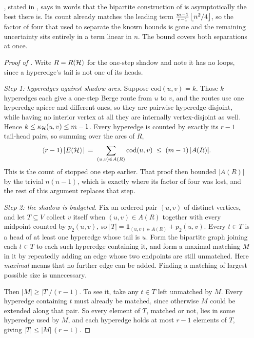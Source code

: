 , stated in , says in words that the bipartite construction of  is asymptotically the best there is. Its count already matches the leading term $\frac{m-1}{r-1}\left\lfloor n^2/4 \right\rfloor$, so the factor of four that used to separate the known bounds is gone and the remaining uncertainty sits entirely in a term linear in $n$. The bound covers both separations at once.

\begin{proof}[Proof of ]
Write $R = R(\mathcal{H})$ for the one-step shadow and note it has no loops, since a
hyperedge's tail is not one of its heads.

\emph{Step 1: hyperedges against shadow arcs.} Suppose $\mathrm{cod}(u,v) = k$.
Those $k$ hyperedges each give a one-step Berge route from $u$ to $v$, and the
routes use one hyperedge apiece and different ones, so they are pairwise
hyperedge-disjoint, while having no interior vertex at all they are internally
vertex-disjoint as well. Hence $k \le \kappa_{\mathcal{H}}(u,v) \le m-1$. Every hyperedge is
counted by exactly its $r-1$ tail-head pairs, so summing over the arcs of $R$,
\[
    (r-1)\,|E(\mathcal{H})| \;=\; \sum_{(u,v) \in A(R)} \mathrm{cod}(u,v)
    \;\le\; (m-1)\,|A(R)| .
\]
This is the count of  stopped one step earlier. That
proof then bounded $|A(R)|$ by the trivial $n(n-1)$, which is exactly where its
factor of four was lost, and the rest of this argument replaces that step.

\emph{Step 2: the shadow is budgeted.} Fix an ordered pair $(u,v)$ of distinct
vertices, and let $T \subseteq V$ collect $v$ itself when $(u,v) \in A(R)$
together with every midpoint counted by $p_2(u,v)$, so
$|T| = \mathbf{1}_{(u,v) \in A(R)} + p_2(u,v)$. Every $t \in T$ is a head of at
least one hyperedge whose tail is $u$. Form the bipartite graph joining each
$t \in T$ to each such hyperedge containing it, and form a maximal matching $M$ in it by repeatedly adding an edge whose two endpoints are still unmatched. Here \emph{maximal} means that no further edge can be added. Finding a matching of largest possible size is unnecessary.

Then $|M| \ge |T|/(r-1)$. To see it, take any $t \in T$ left unmatched by $M$.
Every hyperedge containing $t$ must already be matched, since otherwise $M$ could
be extended along that pair. So every element of $T$, matched or not, lies in
some hyperedge used by $M$, and each hyperedge holds at most $r-1$ elements of
$T$, giving $|T| \le |M|\,(r-1)$.


\end{proof}
